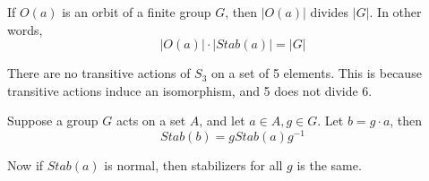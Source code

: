 \begin{thm}
    If $O(a)$ is an orbit of a finite group $G$, then $|O(a)|$ divides $|G|$. In other words, 
    \begin{equation*}
        |O(a)|\cdot |Stab(a)|=|G|
    \end{equation*}
\end{thm}
\begin{example}
    There are no transitive actions of $S_3$ on a set of 5 elements. This is because transitive actions induce an isomorphism, and 5 does not divide 6.
\end{example}
\begin{prop}
    Suppose a group $G$ acts on a set $A$, and let $a\in A, g\in G$. Let $b=g\cdot a$, then 
    \begin{equation*}
        Stab(b)=gStab(a)g^{-1}
    \end{equation*}
\end{prop}
Now if $Stab(a)$ is normal, then stabilizers for all $g$ is the same.



